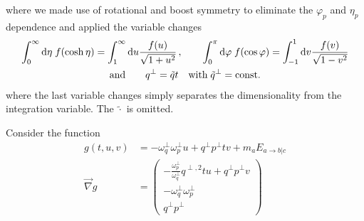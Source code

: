 where we made use of rotational and boost symmetry to eliminate the $\varphi_p$ and $\eta_p$ dependence and applied the variable changes
\begin{gather*}
    \int_0^\infty\text{d}\eta\;f(\cosh\eta)=\int_1^\infty\text{d} u\frac{f(u)}{\sqrt{1+u^2}}\,,\qquad \int_0^\pi\text{d}\varphi\;f(\cos\varphi)=\int_{-1}^1\text{d} v\frac{f(v)}{\sqrt{1-v^2}}\\
   \text{and}\qquad q^\perp=\tilde{q}t\quad\text{with}\;\tilde{q}^\perp={\text{const.}}
\end{gather*}
where the last variable changes simply separates the dimensionality from the integration variable. The $\tilde{\cdot}$ is omitted.

Consider the function
\begin{subequations}
    \begin{align}
        g(t,u,v)&=-\omega_q^\perp \omega_p^\perp u+q^\perp p^\perp tv+m_a E_{a\rightarrow b\vert c}\\
        \vec{\nabla} g&=
        \begin{pmatrix}
            -\frac{\omega_p^\perp}{\omega_q^\perp}q^{\perp,2} tu+q^\perp p^\perp v\\
            -\omega_q^\perp\omega_p^\perp\\
            q^\perp p^\perp
        \end{pmatrix}
    \end{align}
\end{subequations}

